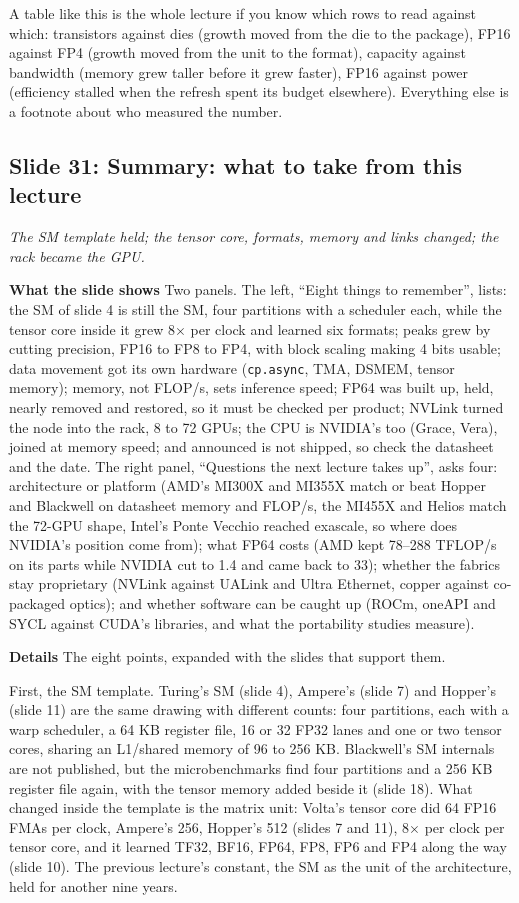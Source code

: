 \documentclass[11pt,letterpaper]{article}
\newcommand{\slide}[3]{%
  \subsection[Slide #1: #2]{Slide #1: #2}%
  {\color{muted}\itshape #3\par}\medskip}
\newcommand{\para}[1]{\medskip\noindent\textbf{#1}\quad}
\newenvironment{intuition}{\begin{tcolorbox}[intuitionbox]}{\end{tcolorbox}}
\begin{document}
\begin{intuition}
A table like this is the whole lecture if you know which rows to read against which: transistors against dies (growth moved from the die to the package), FP16 against FP4 (growth moved from the unit to the format), capacity against bandwidth (memory grew taller before it grew faster), FP16 against power (efficiency stalled when the refresh spent its budget elsewhere). Everything else is a footnote about who measured the number.
\end{intuition}

\slide{31}{Summary: what to take from this lecture}{The SM template held; the tensor core, formats, memory and links changed; the rack became the GPU.}

\para{What the slide shows} Two panels. The left, ``Eight things to remember'', lists: the SM of slide 4 is still the SM, four partitions with a scheduler each, while the tensor core inside it grew 8$\times$ per clock and learned six formats; peaks grew by cutting precision, FP16 to FP8 to FP4, with block scaling making 4 bits usable; data movement got its own hardware (\texttt{cp.async}, TMA, DSMEM, tensor memory); memory, not FLOP/s, sets inference speed; FP64 was built up, held, nearly removed and restored, so it must be checked per product; NVLink turned the node into the rack, 8 to 72 GPUs; the CPU is NVIDIA's too (Grace, Vera), joined at memory speed; and announced is not shipped, so check the datasheet and the date. The right panel, ``Questions the next lecture takes up'', asks four: architecture or platform (AMD's MI300X and MI355X match or beat Hopper and Blackwell on datasheet memory and FLOP/s, the MI455X and Helios match the 72-GPU shape, Intel's Ponte Vecchio reached exascale, so where does NVIDIA's position come from); what FP64 costs (AMD kept 78--288 TFLOP/s on its parts while NVIDIA cut to 1.4 and came back to 33); whether the fabrics stay proprietary (NVLink against UALink and Ultra Ethernet, copper against co-packaged optics); and whether software can be caught up (ROCm, oneAPI and SYCL against CUDA's libraries, and what the portability studies measure).

\para{Details} The eight points, expanded with the slides that support them.

First, the SM template. Turing's SM (slide 4), Ampere's (slide 7) and Hopper's (slide 11) are the same drawing with different counts: four partitions, each with a warp scheduler, a 64 KB register file, 16 or 32 FP32 lanes and one or two tensor cores, sharing an L1/shared memory of 96 to 256 KB. Blackwell's SM internals are not published, but the microbenchmarks find four partitions and a 256 KB register file again, with the tensor memory added beside it (slide 18). What changed inside the template is the matrix unit: Volta's tensor core did 64 FP16 FMAs per clock, Ampere's 256, Hopper's 512 (slides 7 and 11), 8$\times$ per clock per tensor core, and it learned TF32, BF16, FP64, FP8, FP6 and FP4 along the way (slide 10). The previous lecture's constant, the SM as the unit of the architecture, held for another nine years.
\end{document}
